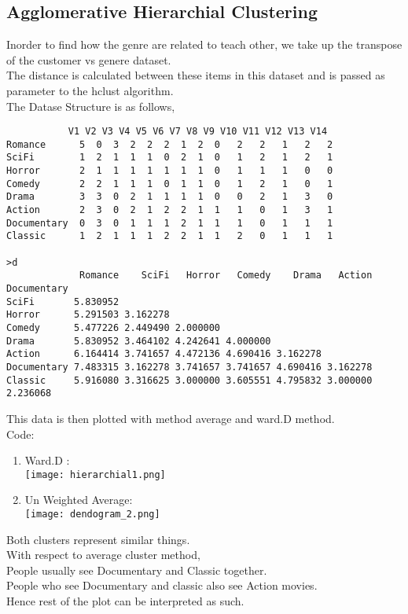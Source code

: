 \documentclass{article}
\begin{document}
\subsection{Agglomerative Hierarchial Clustering}
Inorder to find how the genre are related to teach other, we take up the transpose of the customer vs genere dataset.\\
The distance is calculated between these items in this dataset and is passed as parameter to the hclust algorithm.\\
The Datase Structure is as follows,
\begin{verbatim}
           V1 V2 V3 V4 V5 V6 V7 V8 V9 V10 V11 V12 V13 V14
Romance      5  0  3  2  2  2  1  2  0   2   2   1   2   2
SciFi        1  2  1  1  1  0  2  1  0   1   2   1   2   1
Horror       2  1  1  1  1  1  1  1  0   1   1   1   0   0
Comedy       2  2  1  1  1  0  1  1  0   1   2   1   0   1
Drama        3  3  0  2  1  1  1  1  0   0   2   1   3   0
Action       2  3  0  2  1  2  2  1  1   1   0   1   3   1
Documentary  0  3  0  1  1  1  2  1  1   1   0   1   1   1
Classic      1  2  1  1  1  2  2  1  1   2   0   1   1   1

>d
             Romance    SciFi   Horror   Comedy    Drama   Action Documentary
SciFi       5.830952                                                         
Horror      5.291503 3.162278                                                
Comedy      5.477226 2.449490 2.000000                                       
Drama       5.830952 3.464102 4.242641 4.000000                              
Action      6.164414 3.741657 4.472136 4.690416 3.162278                     
Documentary 7.483315 3.162278 3.741657 3.741657 4.690416 3.162278            
Classic     5.916080 3.316625 3.000000 3.605551 4.795832 3.000000    2.236068
\end{verbatim}
This data is then plotted with method average and ward.D method.\\
Code:\\

\begin{enumerate}
\item Ward.D :\\
\texttt{[image: hierarchial1.png]}\\
\item Un Weighted Average:\\
\texttt{[image: dendogram\_2.png]}\\
\end{enumerate}
Both clusters represent similar things.\\
With respect to average cluster method,\\
People usually see Documentary and Classic together. \\
People who see Documentary and classic also see Action movies.\\
Hence rest of the plot can be interpreted as such.
\end{document}
